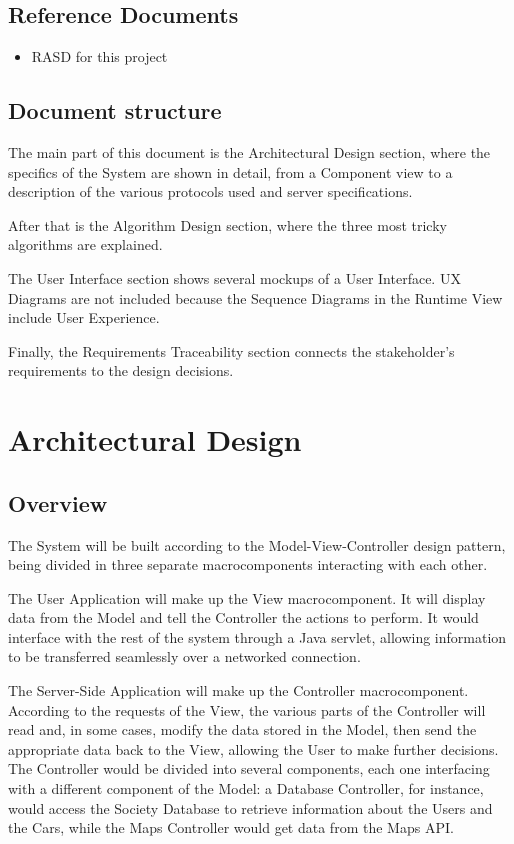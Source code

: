 \documentclass[12pt]{article}
\begin{document}
\subsection{Reference Documents}
\begin{itemize}
	\item RASD for this project
\end{itemize}
\subsection{Document structure}
The main part of this document is the Architectural Design section, where the specifics of the System are shown in detail, from a Component view to a description of the various protocols used and server specifications.

After that is the Algorithm Design section, where the three most tricky algorithms are explained.

The User Interface section shows several mockups of a User Interface. UX Diagrams are not included because the Sequence Diagrams in the Runtime View include User Experience.

Finally, the Requirements Traceability section connects the stakeholder's requirements to the design decisions.

\clearpage
\section{Architectural Design}
\subsection{Overview}
\label{MVC}
The System will be built according to the Model-View-Controller design pattern, being divided in three separate macrocomponents interacting with each other.

The User Application will make up the View macrocomponent. It will display data from the Model and tell the Controller the actions to perform. It would interface with the rest of the system through a Java servlet, allowing information to be transferred seamlessly over a networked connection.

The Server-Side Application will make up the Controller macrocomponent. According to the requests of the View, the various parts of the Controller will read and, in some cases, modify the data stored in the Model, then send the appropriate data back to the View, allowing the User to make further decisions. The Controller would be divided into several components, each one interfacing with a different component of the Model: a Database Controller, for instance, would access the Society Database to retrieve information about the Users and the Cars, while the Maps Controller would get data from the Maps API.
\end{document}
